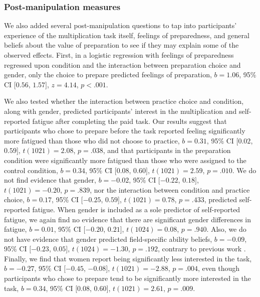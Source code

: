 \documentclass[a4paper, nobind]{templates/ociamthesis}
\begin{document}
\hypertarget{post-manipulation-measures}{%
\subsubsection{Post-manipulation measures}\label{post-manipulation-measures}}

We also added several post-manipulation questions to tap into participants' experience of the multiplication task itself, feelings of preparedness, and general beliefs about the value of preparation to see if they may explain some of the observed effects. First, in a logistic regression with feelings of preparedness regressed upon condition and the interaction between preparation choice and gender, only the choice to prepare predicted feelings of preparation, \(b = 1.06\), 95\% CI \([0.56\), \(1.57]\), \(z = 4.14\), \(p < .001\).

We also tested whether the interaction between practice choice and condition, along with gender, predicted participants' interest in the multiplication and self-reported fatigue after completing the paid task. Our results suggest that participants who chose to prepare before the task reported feeling significantly more fatigued than those who did not choose to practice, \(b = 0.31\), 95\% CI \([0.02\), \(0.59]\), \(t(1021) = 2.08\), \(p = .038\), and that participants in the preparation condition were significantly more fatigued than those who were assigned to the control condition, \(b = 0.34\), 95\% CI \([0.08\), \(0.60]\), \(t(1021) = 2.59\), \(p = .010\). We do not find evidence that gender, \(b = -0.02\), 95\% CI \([-0.22\), \(0.18]\), \(t(1021) = -0.20\), \(p = .839\), nor the interaction between condition and practice choice, \(b = 0.17\), 95\% CI \([-0.25\), \(0.59]\), \(t(1021) = 0.78\), \(p = .433\), predicted self-reported fatigue. When gender is included as a sole predictor of self-reported fatigue, we again find no evidence that there are significant gender differences in fatigue, \(b = 0.01\), 95\% CI \([-0.20\), \(0.21]\), \(t(1024) = 0.08\), \(p = .940\). Also, we do not have evidence that gender predicted field-specific ability beliefs, \(b = -0.09\), 95\% CI \([-0.23\), \(0.05]\), \(t(1024) = -1.30\), \(p = .192\), contrary to previous work \autocite{Leslie2015}. Finally, we find that women report being significantly less interested in the task, \(b = -0.27\), 95\% CI \([-0.45\), \(-0.08]\), \(t(1021) = -2.88\), \(p = .004\), even though participants who chose to prepare tend to be significantly more interested in the task, \(b = 0.34\), 95\% CI \([0.08\), \(0.60]\), \(t(1021) = 2.61\), \(p = .009\).
\end{document}
